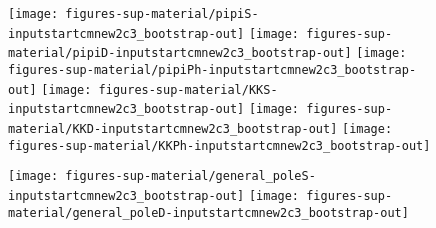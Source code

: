 



\begin{figure}[h]
\centering\texttt{[image: figures-sup-material/pipiS-inputstartcmnew2c3\_bootstrap-out]} \texttt{[image: figures-sup-material/pipiD-inputstartcmnew2c3\_bootstrap-out]} \texttt{[image: figures-sup-material/pipiPh-inputstartcmnew2c3\_bootstrap-out]}
\texttt{[image: figures-sup-material/KKS-inputstartcmnew2c3\_bootstrap-out]} \texttt{[image: figures-sup-material/KKD-inputstartcmnew2c3\_bootstrap-out]} \texttt{[image: figures-sup-material/KKPh-inputstartcmnew2c3\_bootstrap-out]}
\end{figure}

\begin{figure}[h]
\centering\texttt{[image: figures-sup-material/general\_poleS-inputstartcmnew2c3\_bootstrap-out]} \texttt{[image: figures-sup-material/general\_poleD-inputstartcmnew2c3\_bootstrap-out]}
\end{figure}



